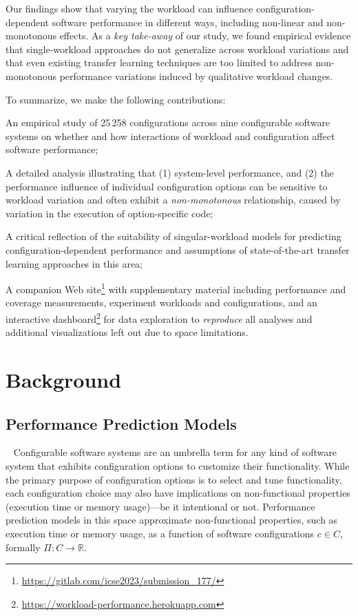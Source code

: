 {\color{black}Our findings show that varying the workload can influence con\-fi\-gu\-ra\-tion-de\-pen\-dent software performance in different ways, including non-linear and non-monotonous effects. 
	As a \textit{key take-away} of our study, we found empirical evidence that single-workload approaches do not generalize across workload variations and that even existing transfer learning techniques are too limited to address non-monotonous performance variations induced by qualitative workload changes. 
}

To summarize, we make the following contributions: 
\begin{compactitem}
	\item An empirical study of 25\,258 configurations across nine configurable software systems on whether and how interactions of workload and configuration affect software  performance;
	{\color{black}
		\item A detailed analysis illustrating that (1) system-level performance, and (2) the performance influence of individual configuration options can be sensitive to workload variation and often exhibit a \textit{non-monotonous} relationship, caused by variation in the execution of option-specific  code;
		
		\item A critical reflection of the suitability of singular-workload models for predicting configuration-dependent performance and assumptions of state-of-the-art transfer learning approaches in this area;}
	
	\item A companion Web site\footnote{\url{https://gitlab.com/icse2023/submission_177/}} with supplementary material including performance and coverage measurements, experiment workloads and configurations, and an interactive dashboard\footnote{\url{https://workload-performance.herokuapp.com}} for data exploration to \textit{reproduce} all analyses and additional visualizations left out due to space limitations.
\end{compactitem}

\section{Background}
\subsection{Performance Prediction Models}~\label{sec:perfmodels}
Configurable software systems are an umbrella term for any kind of software system that exhibits configuration options to customize their functionality. While the primary purpose of configuration options is to select and tune functionality, each configuration choice may also have implications on non-functional properties (execution time or memory usage)---be it intentional or not. 
Performance prediction models in this space approximate non-functional properties, such as execution time or memory usage, as a function of software configurations $c \in C$, formally $\Pi: C \rightarrow \mathbb{R}$. 


